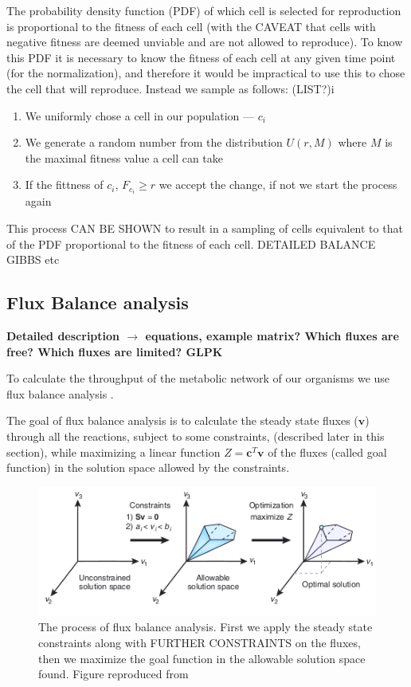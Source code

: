 \documentclass[10pt,a4paper]{article}
\begin{document}
The probability density function (PDF) of which cell is selected for reproduction is proportional to the fitness of each cell (with the CAVEAT that cells with negative fitness are deemed unviable and are not allowed to reproduce). To know this PDF it is necessary to know the fitness of each cell at any given time point (for the normalization), and therefore it would be impractical to use this to chose the cell that will reproduce. Instead we sample as follows: (LIST?)i
\begin{enumerate}
	\item We uniformly chose a cell in our population --- $c_i$
	\item We generate a random number from the distribution $U \left( r,M \right)$ where $M$ is the maximal fitness value a cell can take
	\item If the fittness of $c_i$,  $F_{c_i} \geq r$ we accept the change, if not we start the process again
\end{enumerate}

This process CAN BE SHOWN to result in a sampling of cells equivalent to that of the PDF proportional to the fitness of each cell. DETAILED BALANCE ~ GIBBS etc

\subsection{Flux Balance analysis}
\label{sub:Flux Balance analysis}

\textbf{Detailed description $\rightarrow$ equations, example matrix? Which fluxes are free? Which fluxes are limited? GLPK }



	To calculate the throughput of the metabolic network of our organisms we use flux balance analysis \cite{whatisfluxbalance}. 	

	The goal of flux balance analysis is to calculate the steady state fluxes ($\mathbf{v}$) through all the reactions, subject to some constraints, (described later in this section), while maximizing a linear function $Z=\mathbf{c}^T \mathbf{v}$ of the fluxes (called goal function) in the solution space allowed by the constraints. 

	\begin{figure}[htpb]
		\centering
		\includegraphics[width=0.8\linewidth]{fba_frompaper.png}
		\caption{The process of flux balance analysis. First we apply the steady state constraints along with FURTHER CONSTRAINTS on the fluxes, then we maximize the goal function in the allowable solution space found. Figure reproduced from \cite[]{whatisfluxbalance} }
		\label{fig:fluxbalance}
	\end{figure}
\end{document}
